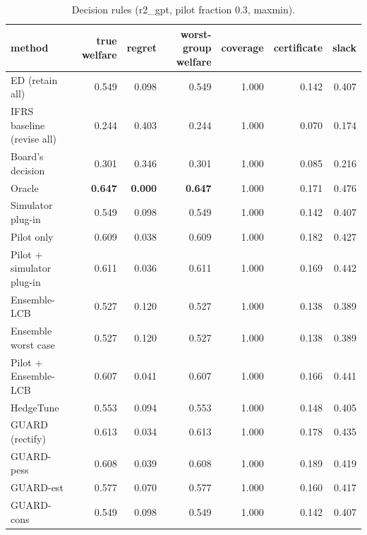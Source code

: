 \begin{table}[t]
\centering
\small
\begin{tabular}{lrrrrrr}
\toprule
method & true welfare & regret & worst-group welfare & coverage & certificate & slack \\
\midrule
ED (retain all) & 0.549 & 0.098 & 0.549 & 1.000 & 0.142 & 0.407 \\
IFRS baseline (revise all) & 0.244 & 0.403 & 0.244 & 1.000 & 0.070 & 0.174 \\
Board's decision & 0.301 & 0.346 & 0.301 & 1.000 & 0.085 & 0.216 \\
Oracle & \textbf{0.647} & \textbf{0.000} & \textbf{0.647} & 1.000 & 0.171 & 0.476 \\
Simulator plug-in & 0.549 & 0.098 & 0.549 & 1.000 & 0.142 & 0.407 \\
Pilot only & 0.609 & 0.038 & 0.609 & 1.000 & 0.182 & 0.427 \\
Pilot + simulator plug-in & 0.611 & 0.036 & 0.611 & 1.000 & 0.169 & 0.442 \\
Ensemble-LCB & 0.527 & 0.120 & 0.527 & 1.000 & 0.138 & 0.389 \\
Ensemble worst case & 0.527 & 0.120 & 0.527 & 1.000 & 0.138 & 0.389 \\
Pilot + Ensemble-LCB & 0.607 & 0.041 & 0.607 & 1.000 & 0.166 & 0.441 \\
HedgeTune & 0.553 & 0.094 & 0.553 & 1.000 & 0.148 & 0.405 \\
GUARD (rectify) & 0.613 & 0.034 & 0.613 & 1.000 & 0.178 & 0.435 \\
GUARD-pess & 0.608 & 0.039 & 0.608 & 1.000 & 0.189 & 0.419 \\
GUARD-est & 0.577 & 0.070 & 0.577 & 1.000 & 0.160 & 0.417 \\
GUARD-cons & 0.549 & 0.098 & 0.549 & 1.000 & 0.142 & 0.407 \\
\bottomrule
\end{tabular}
\caption{Decision rules (r2\_gpt, pilot fraction 0.3, maxmin).}
\label{tab:methods-maxmin}
\end{table}
